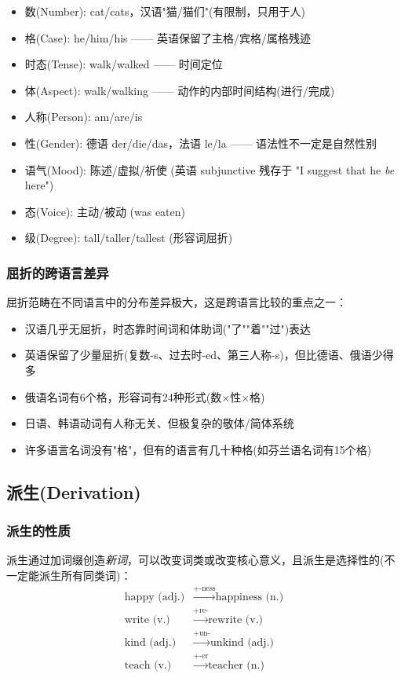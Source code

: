 \begin{itemize}
    \item 数(Number): cat/cats，汉语"猫/猫们"(有限制，只用于人)
    \item 格(Case): he/him/his —— 英语保留了主格/宾格/属格残迹
    \item 时态(Tense): walk/walked —— 时间定位
    \item 体(Aspect): walk/walking —— 动作的内部时间结构(进行/完成)
    \item 人称(Person): am/are/is
    \item 性(Gender): 德语 der/die/das，法语 le/la —— 语法性不一定是自然性别
    \item 语气(Mood): 陈述/虚拟/祈使 (英语 subjunctive 残存于 "I suggest that he \emph{be} here")
    \item 态(Voice): 主动/被动 (was eaten)
    \item 级(Degree): tall/taller/tallest (形容词屈折)
\end{itemize}

\subsubsection{屈折的跨语言差异}

屈折范畴在不同语言中的分布差异极大，这是跨语言比较的重点之一：
\begin{itemize}
    \item 汉语几乎无屈折，时态靠时间词和体助词("了""着""过")表达
    \item 英语保留了少量屈折(复数-s、过去时-ed、第三人称-s)，但比德语、俄语少得多
    \item 俄语名词有6个格，形容词有24种形式(数×性×格)
    \item 日语、韩语动词有人称无关、但极复杂的敬体/简体系统
    \item 许多语言名词没有"格"，但有的语言有几十种格(如芬兰语名词有15个格)
\end{itemize}

\subsection{派生(Derivation)}

\subsubsection{派生的性质}

派生通过加词缀创造\emph{新词}，可以改变词类或改变核心意义，且派生是选择性的(不一定能派生所有同类词)：
\begin{align}
    \text{happy (adj.)} &\xrightarrow{+\text{-ness}} \text{happiness (n.)} \\
    \text{write (v.)} &\xrightarrow{+\text{re-}} \text{rewrite (v.)} \\
    \text{kind (adj.)} &\xrightarrow{+\text{un-}} \text{unkind (adj.)} \\
    \text{teach (v.)} &\xrightarrow{+\text{-er}} \text{teacher (n.)}
\end{align}

